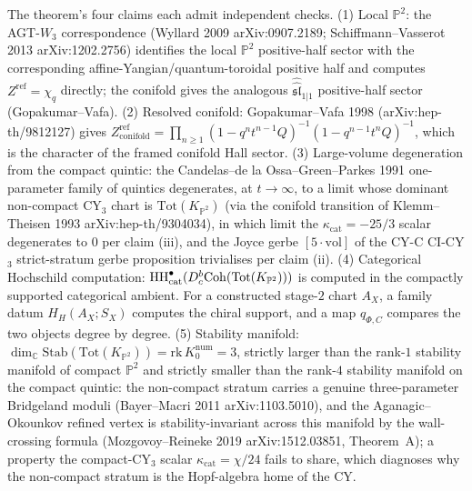 \begin{remark}
\label{rem:cy-c-beyond-noncompact-five-paths}
The theorem's four claims each admit independent checks.
\textup{(1)} Local $\mathbb P^2$: the AGT-$W_3$ correspondence
(Wyllard 2009 arXiv:0907.2189; Schiffmann--Vasserot 2013
arXiv:1202.2756) identifies the local \(\mathbb P^2\) positive-half
sector with the corresponding affine-Yangian/quantum-toroidal
positive half and computes \(Z^{\mathrm{ref}}=\chi_q\) directly; the
conifold gives the analogous \(\widehat{\widehat{\mathfrak{sl}}}_{1|1}\)
positive-half sector
(Gopakumar--Vafa). \textup{(2)} Resolved conifold:
Gopakumar--Vafa 1998 (arXiv:hep-th/9812127) gives
$Z^{\mathrm{ref}}_{\mathrm{conifold}} = \prod_{n \geq 1}
(1 - q^n t^{n-1} Q)^{-1}(1 - q^{n-1} t^n Q)^{-1}$, which is the
character of the framed conifold Hall sector. \textup{(3)}
Large-volume degeneration from the compact quintic: the
Candelas--de la Ossa--Green--Parkes 1991 one-parameter
family of quintics degenerates, at $t \to \infty$, to a
limit whose dominant non-compact CY$_3$ chart is
$\mathrm{Tot}(K_{\mathbb P^2})$ (via the conifold transition
of Klemm--Theisen 1993 arXiv:hep-th/9304034), in which
limit the $\kappa_{\mathrm{cat}} = -25/3$ scalar degenerates
to $0$ per claim (iii), and the Joyce gerbe
$[5 \cdot \mathrm{vol}]$ of
the CY-C CI-CY$_3$ strict-stratum gerbe proposition
trivialises per claim (ii). \textup{(4)} Categorical Hochschild computation:
$\mathrm{HH}^\bullet_{\mathrm{cat}}(D^b_c\mathrm{Coh}(\mathrm{Tot}(K_{\mathbb P^2})))$
is computed in the compactly supported categorical ambient.  For a
constructed stage-$2$ chart $A_X$, a family datum $H_H(A_X;S_X)$
computes the chiral support, and a map $q_{\Phi,C}$ compares the two
objects degree by degree. \textup{(5)} Stability manifold:
$\dim_{\mathbb C} \mathrm{Stab}(\mathrm{Tot}(K_{\mathbb P^2})) =
\mathrm{rk}\,K_0^{\mathrm{num}} = 3$, strictly larger than the
rank-$1$ stability manifold of compact $\mathbb P^2$ and
strictly smaller than the rank-$4$ stability manifold on the
compact quintic: the non-compact stratum carries a genuine
three-parameter Bridgeland moduli (Bayer--Macri 2011
arXiv:1103.5010), and the Aganagic--Okounkov refined vertex
is stability-invariant across this manifold by the
wall-crossing formula (Mozgovoy--Reineke 2019
arXiv:1512.03851, Theorem~A); a property the compact-CY$_3$
scalar $\kappa_{\mathrm{cat}} = \chi/24$ fails to share, which
diagnoses why the non-compact stratum is the Hopf-algebra
home of the CY.
\end{remark}

